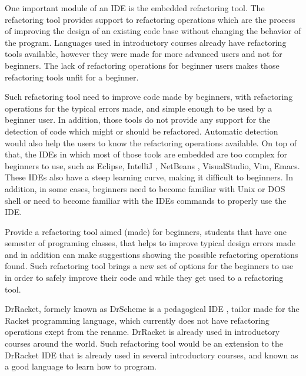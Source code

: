One important module of an IDE is the embedded refactoring tool. %
The refactoring tool provides support to refactoring operations which are the process of improving the design
of an existing code base \cite{fowler1999refactoring} without changing the behavior of the program.
Languages used in introductory courses already have refactoring tools available, %
however they were made for more advanced users and not for beginners.
The lack of refactoring operations for beginner users makes those refactoring tools
unfit for a beginner.

Such refactoring tool need to improve code made by beginners, with refactoring operations for %
the typical errors made, and simple enough to be used by a beginner user.
In addition, those tools do not provide any support for the detection of code which might or should %
be refactored.
Automatic detection would also help the users to know the refactoring operations available.
On top of that, the IDEs in which most of those tools are embedded are too complex for beginners
to use, such as Eclipse\cite{carlson2005eclipse}, IntelliJ \cite{bock2011intellij}, NetBeans \cite{boudreau2002netbeans},
 VisualStudio, Vim\cite{moolenaar2008vim}, Emacs\cite{stallman2007gnu}.
These IDEs also have a steep learning curve, making it difficult to beginners.
In addition, in some %
cases, beginners need to become familiar with Unix or DOS shell or need to
become familiar with the IDEs commands to properly use the IDE.

Provide a refactoring tool aimed (made) for beginners, students that have one semester %
of programing classes, that helps to improve typical design errors made and in addition can
make suggestions showing the possible refactoring operations found.
Such refactoring tool brings a new set of options for the beginners to use
in order to safely improve their code and while they get used to a refactoring tool.


DrRacket, formely known as DrScheme is a pedagogical IDE \cite{drscheme} \cite{drscheme_pegadogy},
tailor made for the Racket programming language, which currently does not
have refactoring operations exept from the rename.
DrRacket is already used in introductory courses around the world.
Such refactoring tool would be an extension to the DrRacket IDE that is already
used in several introductory courses, and known as a good language to learn how to program.


